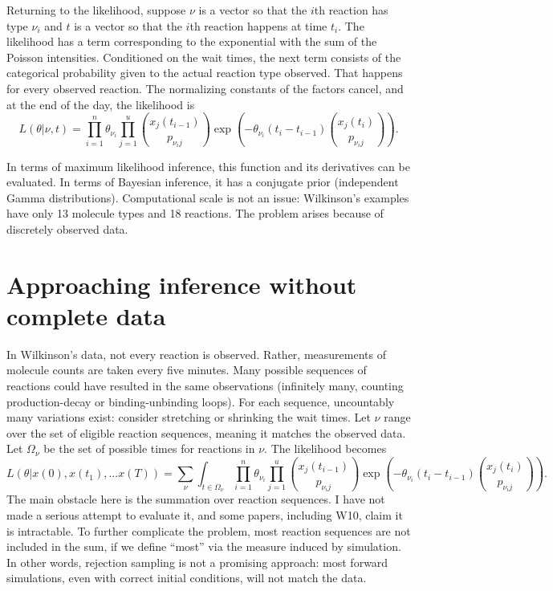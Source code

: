 \documentclass{article}
\begin{document}
Returning to the likelihood, suppose $\nu$ is a vector so that the $i$th reaction has type $\nu_i$ and $t$ is a vector so that the $i$th reaction happens at time $t_i$. The likelihood has a term corresponding to the exponential with the sum of the Poisson intensities. Conditioned on the wait times, the next term consists of the categorical probability given to the actual reaction type observed. That happens for every observed reaction. The normalizing constants of the factors cancel, and at the end of the day, the likelihood is 
\begin{equation} 
\label{eqn:complete_data}
L(\theta|\nu, t) = \prod_{i=1}^n \theta_{\nu_{i}} \prod_{j=1}^u {{x_{j}(t_{i-1})}\choose{p_{{\nu_{i}}j}}}\exp\left(-\theta_{\nu_{i}} (t_{i}-t_{i-1}) {{x_j(t_{i})}\choose{p_{{\nu_{i}}j}}}\right).
\end{equation} 

In terms of maximum likelihood inference, this function and its derivatives can be evaluated. In terms of Bayesian inference, it has a conjugate prior (independent Gamma distributions). Computational scale is not an issue: Wilkinson's examples have only 13 molecule types and 18 reactions. The problem arises because of discretely observed data.

\section{Approaching inference without complete data}
\label{sec:intro_em}

In Wilkinson's data, not every reaction is observed. Rather, measurements of molecule counts are taken every five minutes. Many possible sequences of reactions could have resulted in the same observations (infinitely many, counting production-decay or binding-unbinding loops). For each sequence, uncountably many variations exist: consider stretching or shrinking the wait times. Let $\nu$ range over the set of eligible reaction sequences, meaning it matches the observed data. Let $\Omega_{\nu}$ be the set of possible times for reactions in $\nu$. The likelihood becomes 
\begin{equation}\label{eqn_nasty_lik}
L(\theta|x(0), x(t_1), ... x(T)) =\sum_{\nu}\int_{t\in \Omega_{\nu}} \prod_{i=1}^n \theta_{\nu_{i}} \prod_{j=1}^u {{x_{j}(t_{i-1})}\choose{p_{{\nu_{i}}j}}}\exp\left(-\theta_{\nu_{i}} (t_{i}-t_{i-1}) {{x_j(t_{i})}\choose{p_{{\nu_{i}}j}}}\right).
\end{equation}
The main obstacle here is the summation over reaction sequences. I have not made a serious attempt to evaluate it, and some papers, including W10, claim it is intractable. To further complicate the problem, most reaction sequences are not included in the sum, if we define ``most'' via the measure induced by simulation. In other words, rejection sampling is not a promising approach: most forward simulations, even with correct initial conditions, will not match the data. 
\end{document}
